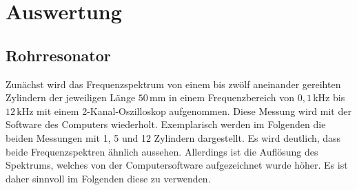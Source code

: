 \section{Auswertung}
\subsection{Rohrresonator}
Zunächst wird das Frequenzspektrum von einem bis zwölf aneinander gereihten Zylindern der jeweiligen Länge $50\,$mm
in einem Frequenzbereich von $0,1\,$kHz bis $12\,$kHz mit einem 2-Kanal-Oszilloskop aufgenommen.
Diese Messung wird mit der Software des Computers wiederholt.
Exemplarisch werden im Folgenden die beiden Messungen mit \num{1}, \num{5} und \num{12} Zylindern dargestellt.
Es wird deutlich, dass beide Frequenzspektren ähnlich aussehen. Allerdings ist die Auflösung 
des Spektrums, welches von der Computersoftware aufgezeichnet wurde höher. Es ist daher sinnvoll im Folgenden
diese zu verwenden.

